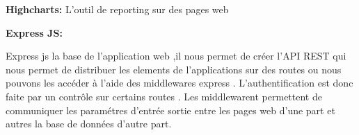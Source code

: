 \textbf{ Highcharts: }
L'outil de \guillemotleft{} reporting \guillemotright{} sur des pages web
\bigskip



\textbf{ Express JS:}

Express js la base de l'application web ,il nous permet de cr\'{e}er l'API REST
qui nous permet de distribuer les elements de l'applications sur des \guillemotleft{} routes \guillemotright{}
ou nous pouvons les acc\'{e}der \`{a} l'aide des middlewares express .
L'authentification est donc faite par un contr\^{o}le sur certains \guillemotleft{} routes \guillemotright{}.
Les middlewarent permettent de communiquer les param\'{e}tres d'entr\'{e}e sortie
entre les pages web d'une part et autres la base de donn\'{e}es d'autre part.
























